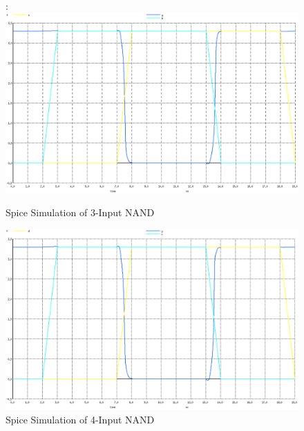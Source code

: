 \documentclass[12pt]{article}
\begin{document}
\begin{figure}[H]:
	\centering
	\includegraphics[width=0.70\linewidth, keepaspectratio]{Graphics/3NAND_spice}
	\caption{Spice Simulation of 3-Input NAND}
	\label{fig:spice_3NAND}
\end{figure}

\begin{figure}[H]
	\centering
	\includegraphics[width=0.70\linewidth, keepaspectratio]{Graphics/4NAND_spice}
	\caption{Spice Simulation of 4-Input NAND}
	\label{fig:spice_4NAND}
\end{figure}
\end{document}
